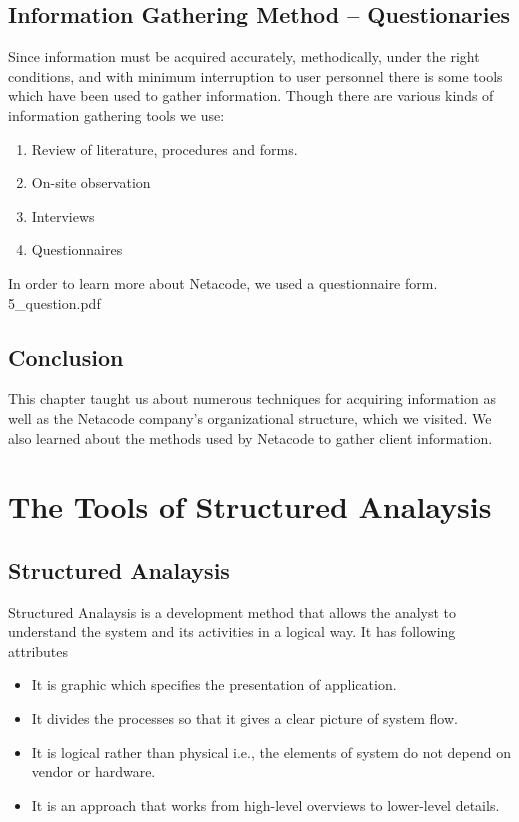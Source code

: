\documentclass[a4paper,12pt]{report}
\begin{document}
\section{Information Gathering Method – Questionaries}
Since information must be acquired accurately, methodically, under the right conditions, and
with minimum interruption to user personnel there is some tools which have been used to gather
information. Though there are various kinds of information gathering tools we use:\\
\begin{enumerate}
	\item  Review of literature, procedures and forms.
	\item  On-site observation
	\item  Interviews
	\item Questionnaires
\end{enumerate}
In order to learn more about Netacode, we used a questionnaire form.
	 {5_question.pdf}
\section{Conclusion}
This chapter taught us about numerous techniques for acquiring information as well as the Netacode company's organizational structure, which we visited. We also learned about the methods used by Netacode to gather client information.















\chapter{The Tools of Structured Analaysis}
\section{Structured Analaysis}
Structured Analaysis is a development method that allows the analyst to understand the system and its activities in a logical way.
It has following attributes 
\begin{itemize}
		\item	It is graphic which specifies the presentation of application. 
		\item	It divides the processes so that it gives a clear picture of system flow.  
		\item	It is logical rather than physical i.e., the elements of system do not depend on vendor or hardware.  
		\item	It is an approach that works from high-level overviews to lower-level details.
\end{itemize}
\end{document}

